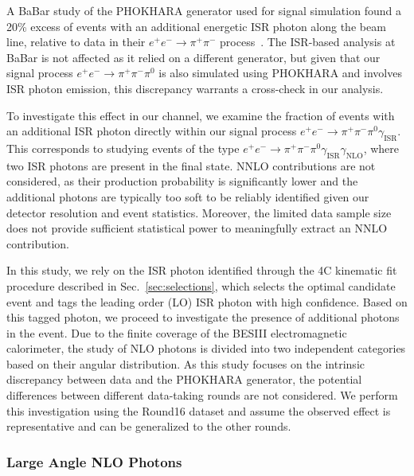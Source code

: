 A BaBar study of the PHOKHARA generator used for signal simulation found a 20\% excess of events with an additional energetic ISR photon along the beam line, relative to data in their \( e^+e^- \to \pi^+\pi^- \) process~\cite{PhysRevD.108.L111103}. The ISR-based analysis at BaBar is not affected as it relied on a different generator, but given that our signal process \( e^+e^- \to \pi^+\pi^-\pi^0 \) is also simulated using PHOKHARA and involves ISR photon emission, this discrepancy warrants a cross-check in our analysis.

To investigate this effect in our channel, we examine the fraction of events with an additional ISR photon directly within our signal process \( e^+e^- \to \pi^+\pi^-\pi^0\gamma_{\text{ISR}} \). This corresponds to studying events of the type \( e^+e^- \to \pi^+\pi^-\pi^0\gamma_{\text{ISR}}\gamma_{\text{NLO}} \), where two ISR photons are present in the final state. NNLO contributions are not considered, as their production probability is significantly lower and the additional photons are typically too soft to be reliably identified given our detector resolution and event statistics. Moreover, the limited data sample size does not provide sufficient statistical power to meaningfully extract an NNLO contribution.

In this study, we rely on the ISR photon identified through the 4C kinematic fit procedure described in Sec.~\ref{sec:selections}, which selects the optimal candidate event and tags the leading order (LO) ISR photon with high confidence. Based on this tagged photon, we proceed to investigate the presence of additional photons in the event. Due to the finite coverage of the BESIII electromagnetic calorimeter, the study of NLO photons is divided into two independent categories based on their angular distribution. As this study focuses on the intrinsic discrepancy between data and the PHOKHARA generator, the potential differences between different data-taking rounds are not considered. We perform this investigation using the Round16 dataset and assume the observed effect is representative and can be generalized to the other rounds.

\subsubsection{Large Angle NLO Photons}
\label{sec:nlo_la}

